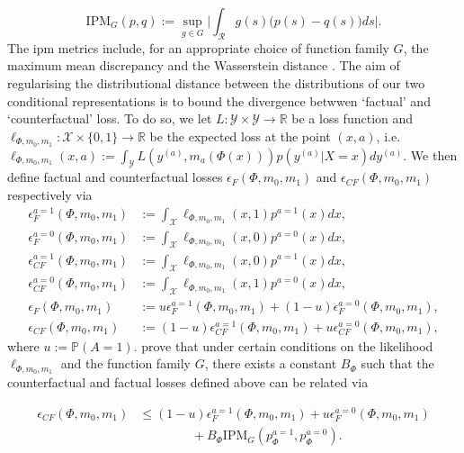 \documentclass[../thesis.tex]{subfiles}
\begin{document}
\[ \mathrm{IPM}_G(p,q) := \sup_{g \in G} \Big| \int_{\mathcal{R}} g(s)\big(p(s)-q(s)\big)ds\Big|.\]
The \gls{ipm} metrics include, for an appropriate choice of function family $G$, the maximum mean discrepancy \citep{gretton_covariate_2008} and the Wasserstein distance \citep{villani_optimal_2009, sriperumbudur_empirical_2012, cuturi_sinkhorn_2013}. The aim of regularising the distributional distance between the distributions of our two conditional representations is to bound the divergence betwwen `factual' and `counterfactual' loss. To do so, we let $L \colon \mathcal{Y} \times \mathcal{Y} \rightarrow \mathbb{R}$ be a loss function and $\ell_{\Phi, m_0, m_1} \colon \mathcal{X} \times \{0,1\} \rightarrow \mathbb{R}$ be the expected loss at the point $(x,a)$, i.e. $\ell_{\Phi, m_0, m_1}(x,a) := \int_\mathcal{Y} L(y^{(a)}, m_a(\Phi(x)))p(y^{(a)}|X=x)dy^{(a)}$. We then define factual and counterfactual losses $\epsilon_F(\Phi, m_0, m_1)$ and $\epsilon_{CF}(\Phi, m_0, m_1)$ respectively via
\begin{align*}
    \epsilon^{a=1}_F(\Phi, m_0, m_1) & := \int_{\mathcal{X}} \ell_{\Phi, m_0, m_1}(x, 1)p^{a=1}(x)dx, \\
    \epsilon^{a=0}_F(\Phi, m_0, m_1) & := \int_{\mathcal{X}} \ell_{\Phi, m_0, m_1}(x, 0)p^{a=0}(x)dx, \\
    \epsilon^{a=1}_{CF}(\Phi, m_0, m_1) & := \int_{\mathcal{X}} \ell_{\Phi, m_0, m_1}(x, 0)p^{a=1}(x)dx, \\
    \epsilon^{a=0}_{CF}(\Phi, m_0, m_1) & := \int_{\mathcal{X}} \ell_{\Phi, m_0, m_1}(x, 1)p^{a=0}(x)dx, \\
    \epsilon_F(\Phi, m_0, m_1) & := u \epsilon^{a=1}_{F}(\Phi, m_0, m_1)  + (1-u) \epsilon^{a=0}_{F}(\Phi, m_0, m_1), \\
    \epsilon_{CF}(\Phi, m_0, m_1) & := (1-u) \epsilon^{a=1}_{CF}(\Phi, m_0, m_1)  + u \epsilon^{a=0}_{CF}(\Phi, m_0, m_1), 
\end{align*}
where $u := \mathbb{P}(A=1)$. \citet{shalit_estimating_2017} prove that under certain conditions on the likelihood $\ell_{\Phi, m_0, m_1}$ and the function family $G$, there exists a constant $B_\Phi$ such that the counterfactual and factual losses defined above can be related via

\begin{align*}
    \epsilon_{CF}(\Phi, m_0, m_1)  & \leq (1-u)\epsilon_F^{a=1}(\Phi, m_0, m_1) + u\epsilon_F^{a=0}(\Phi, m_0, m_1) \\
& \hspace{50pt} + B_\Phi \mathrm{IPM}_G(p_{\Phi}^{a=1}, p_{\Phi}^{a=0}).
\end{align*} 
\end{document}
